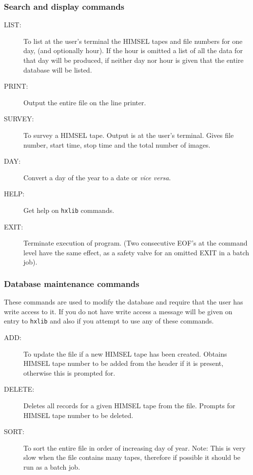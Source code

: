 \subsubsection{Search and display commands}

\begin{description}      
\item[LIST: ]    To list at the user's terminal the HIMSEL tapes and file
numbers for one day, (and optionally hour). If the hour is omitted a
list of all the data for that day will be produced, if neither day nor
hour is given that the entire database will be listed.

\item[PRINT: ]    Output the entire file on the line printer.

\item[SURVEY: ]   To survey a HIMSEL tape. Output is at the user's terminal.
Gives file number, start time, stop time and the total number of
images.

\item[DAY: ] Convert a day of the year to a date or {\em vice versa}.

\item[HELP: ] Get help on \verb!hxlib! commands.

\item[EXIT: ]     Terminate execution of program. (Two consecutive EOF's at
the command level have the same effect, as a safety valve for an
omitted EXIT in a batch job).
\end{description}

\subsubsection{Database maintenance commands}

These commands are used to modify the database and require that the
user has write access to it.  If you do not have write access a message
will be given on entry to \verb!hxlib! and also if you attempt to use
any of these commands.

\begin{description}
\item[ADD: ]  To update the file if a new HIMSEL tape has been created.
Obtains HIMSEL tape number to be added from the header if it is
present, otherwise this is prompted for.

\item[DELETE: ] Deletes all records for a given HIMSEL tape from the file. 
Prompts for HIMSEL tape number to be deleted.

\item[SORT: ]  To sort the entire file in order of increasing day of
year. Note: This is very slow when the file contains many tapes,
therefore if possible it should be run as a batch job.
\end{description}       

